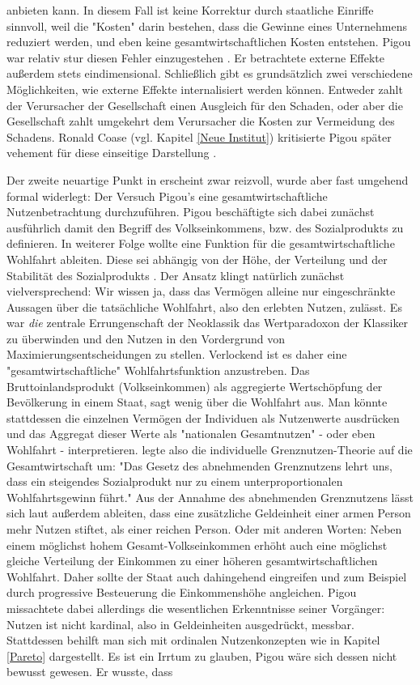 anbieten kann. In diesem Fall ist keine Korrektur durch staatliche Einriffe sinnvoll, weil die "Kosten" darin bestehen, dass die Gewinne eines Unternehmens reduziert werden, und eben keine gesamtwirtschaftlichen Kosten entstehen. Pigou war relativ stur diesen Fehler einzugestehen \parencite[S. 153]{Johnson1960}. Er betrachtete externe Effekte außerdem stets eindimensional. Schließlich gibt es grundsätzlich zwei verschiedene Möglichkeiten, wie externe Effekte internalisiert werden können. Entweder zahlt der Verursacher der Gesellschaft einen Ausgleich für den Schaden, oder aber die Gesellschaft zahlt umgekehrt dem Verursacher die Kosten zur Vermeidung des Schadens. Ronald Coase (vgl. Kapitel \ref{Neue Institut}) kritisierte Pigou später vehement für diese einseitige Darstellung \parencite[S. 243]{Cansier1989}.

Der zweite neuartige Punkt in \textcite{Pigou1920} erscheint zwar reizvoll, wurde aber fast umgehend formal widerlegt: Der Versuch Pigou's eine gesamtwirtschaftliche Nutzenbetrachtung durchzuführen. Pigou beschäftigte sich dabei zunächst ausführlich damit den Begriff des Volkseinkommens, bzw. des Sozialprodukts zu definieren. In weiterer Folge wollte eine Funktion für die gesamtwirtschaftliche Wohlfahrt ableiten. Diese sei abhängig von der Höhe, der Verteilung und der Stabilität des Sozialprodukts \parencite[S. 42]{Pigou1920}. Der Ansatz klingt natürlich zunächst vielversprechend: Wir wissen ja, dass das Vermögen alleine nur eingeschränkte Aussagen über die tatsächliche Wohlfahrt, also den erlebten Nutzen, zulässt. Es war \textit{die} zentrale Errungenschaft der Neoklassik das Wertparadoxon der Klassiker zu überwinden und den Nutzen in den Vordergrund von Maximierungsentscheidungen zu stellen. Verlockend ist es daher eine "gesamtwirtschaftliche" Wohlfahrtsfunktion anzustreben. Das Bruttoinlandsprodukt (Volkseinkommen) als aggregierte Wertschöpfung der Bevölkerung in einem Staat, sagt wenig über die Wohlfahrt aus. Man könnte stattdessen die einzelnen Vermögen der Individuen als Nutzenwerte ausdrücken und das Aggregat dieser Werte als "nationalen Gesamtnutzen" - oder eben Wohlfahrt - interpretieren. \textcite[S. 48]{Pigou1920} legte also die individuelle Grenznutzen-Theorie auf die Gesamtwirtschaft um: "Das Gesetz des abnehmenden Grenznutzens lehrt uns, dass ein steigendes Sozialprodukt nur zu einem unterproportionalen Wohlfahrtsgewinn führt." Aus der Annahme des abnehmenden Grenznutzens lässt sich laut \textcite[S. 53]{Pigou1920} außerdem ableiten, dass eine zusätzliche Geldeinheit einer armen Person mehr Nutzen stiftet, als einer reichen Person. Oder mit anderen Worten: Neben einem möglichst hohem Gesamt-Volkseinkommen erhöht auch eine möglichst gleiche Verteilung der Einkommen zu einer höheren gesamtwirtschaftlichen Wohlfahrt. Daher sollte der Staat auch dahingehend eingreifen und zum Beispiel durch progressive Besteuerung die Einkommenshöhe angleichen. Pigou missachtete dabei allerdings die wesentlichen Erkenntnisse seiner Vorgänger: Nutzen ist nicht kardinal, also in Geldeinheiten ausgedrückt, messbar. Stattdessen behilft man sich mit ordinalen Nutzenkonzepten wie in Kapitel \ref{Pareto} dargestellt. Es ist ein Irrtum zu glauben, Pigou wäre sich dessen nicht bewusst gewesen. Er wusste, dass 